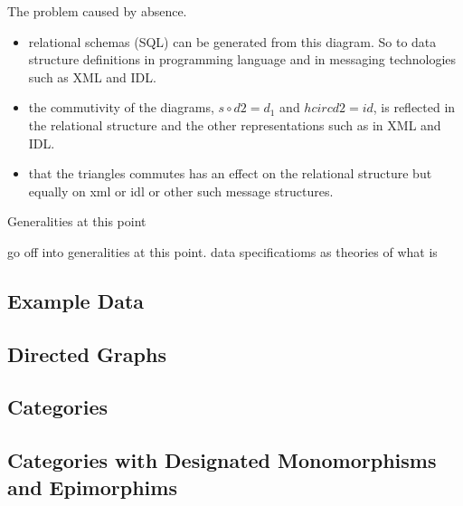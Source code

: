 \begin{frame}{The problem caused by absence.}
\begin{itemize}
\item relational schemas (SQL) can be generated from this diagram. So to data structure definitions in programming language and in messaging technologies such as XML and IDL. 
\item the commutivity of the diagrams, $s \circ d2 = d_1$ and $h circ d2 =id$, is reflected in the relational structure and the other representations such as in XML and IDL.  
\item that the triangles commutes has an effect on the relational structure but equally on xml or idl or other such message structures. 
\end{itemize}
\end{frame}

\begin{frame}{Generalities at this point}

go off into generalities at this point. data specificatioms as theories of what is
\end{frame}


\iffalse
\subsection{Preamble}


\subsection{Introduction}

\fi

\iffalse
\subsection{Example Data}


\subsection{Directed Graphs}


\subsection{Categories}



\subsection{Categories with Designated Monomorphisms and Epimorphims}


